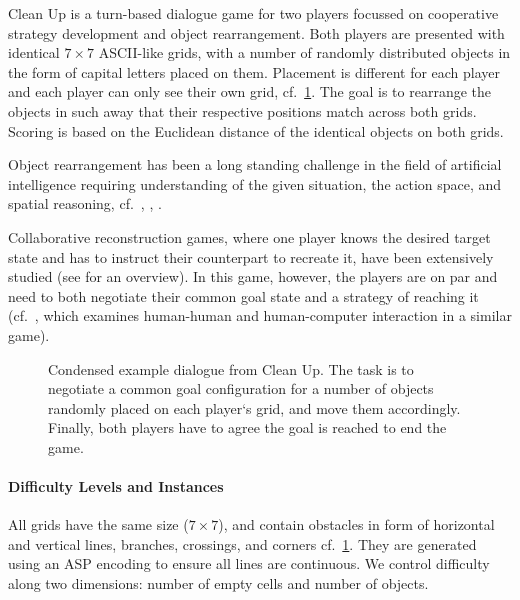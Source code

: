 Clean Up is a turn-based dialogue game for two players focussed on cooperative strategy development and object rearrangement. Both players are presented with identical $7\times7$ ASCII-like grids, with a number of randomly distributed objects in the form of capital letters placed on them. Placement is different for each player and each player can only see their own grid, cf.~\cref{fig:clean_up_example}. The goal is to rearrange the objects in such away that their respective positions match across both grids. Scoring is based on the Euclidean distance of the identical objects on both grids.

Object rearrangement has been a long standing challenge in the field of artificial intelligence requiring understanding of the given situation, the action space, and spatial reasoning, cf.~\citet{DBLP:journals/corr/abs-2011-01975}, \citet{DBLP:journals/ral/ZengWYZDCD24}, \citet{DBLP:journals/access/KhanQCASR25}.

Collaborative reconstruction games, where one player knows the desired target state and has to instruct their counterpart to recreate it, have been extensively studied (see \citet{DBLP:journals/jair/SugliaKL24} for an overview). In this game, however, the players are on par and need to both negotiate their common goal state and a strategy of reaching it (cf.~\citet{DBLP:conf/sigdial/JeknicSK24}, which examines human-human and human-computer interaction in a similar game).

\begin{figure}[ht!]
    \centering
    
    \caption{Condensed example dialogue from Clean Up. The task is to negotiate a common goal configuration for a number of objects randomly placed on each player`s grid, and move them accordingly. Finally, both players have to agree the goal is reached to end the game. }
    \label{fig:clean_up_example}
\end{figure}

\paragraph{Difficulty Levels and Instances}\label{sec:clean_up_difficulty_levels}  All grids have the same size ($7\times7$), and contain obstacles in form of horizontal and vertical lines, branches, crossings, and corners cf.~\cref{fig:clean_up_example}. They are generated using an ASP encoding to ensure all lines are continuous. We control difficulty along two dimensions: number of empty cells and number of objects.

